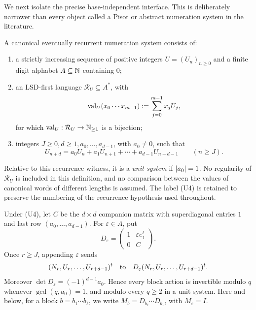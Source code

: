 We next isolate the precise base-independent interface. This is
deliberately narrower than every object called a Pisot or abstract
numeration system in the literature.

\begin{definition}
  \label{def:canonical-eventually-recurrent-numeration}
  A canonical eventually recurrent numeration system consists of:
  \begin{enumerate}[label={}]
    \item[\textup{(U1)}] a strictly increasing sequence of positive integers
    \(U=(U_n)_{n\ge0}\) and a finite digit alphabet
    \(A\subseteq\mathbb{N}\) containing \(0\);
    \item[\textup{(U2)}] an LSD-first language
    \(\mathcal R_U\subseteq A^\ast\), with
    \[
      \operatorname{val}_U(x_0\cdots x_{m-1})
        :=\sum_{j=0}^{m-1}x_jU_j,
    \]
    for which \(\operatorname{val}_U:\mathcal R_U\to\mathbb{N}_{\ge1}\) is a bijection;
    \item[\textup{(U4)}] integers \(J\ge0,d\ge1,a_0,\ldots,a_{d-1}\), with
    \(a_0\ne0\), such that
    \[
      U_{n+d}=a_0U_n+a_1U_{n+1}+\cdots+a_{d-1}U_{n+d-1}
      \qquad(n\ge J).
    \]
  \end{enumerate}
  Relative to this recurrence witness, it is a \emph{unit system} if
  \(\lvert a_0 \rvert=1\). No regularity of \(\mathcal R_U\) is included in
  this definition, and no comparison between the values of canonical words
  of different lengths is assumed. The label \textup{(U4)} is retained to
  preserve the numbering of the recurrence hypothesis used throughout.
\end{definition}

\begin{lemma}
  \label{lem:affine-recurrence-block-action}
  Under \textup{(U4)}, let \(C\) be the \(d\times d\) companion matrix
  with superdiagonal entries \(1\) and last row
  \((a_0,\ldots,a_{d-1})\). For \(\varepsilon\in A\), put
  \[
    D_\varepsilon=
    \begin{pmatrix}
      1&\varepsilon e_1^t\\
      0&C
    \end{pmatrix}.
  \]
  Once \(r\ge J\), appending \(\varepsilon\) sends
  \[
    (N_r,U_r,\ldots,U_{r+d-1})^t
    \quad\hbox{to}\quad
    D_\varepsilon(N_r,U_r,\ldots,U_{r+d-1})^t.
  \]
  Moreover
  \(\det D_\varepsilon=(-1)^{d-1}a_0\). Hence every block action is
  invertible modulo \(q\) whenever \(\gcd(q,a_0)=1\), and modulo every
  \(q\ge2\) in a unit system. Here and below, for a block
  \(b=b_1\cdots b_\ell\), we write
  \(M_b=D_{b_\ell}\cdots D_{b_1}\), with \(M_\varepsilon=I\).
\end{lemma}

